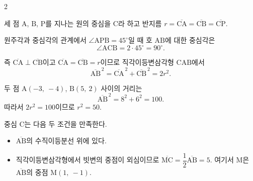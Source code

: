 \documentclass[10pt,fleqn]{article}
\begin{document}
\begin{multicols}{2}

\begin{center}
\end{center}

세 점 $\mathrm{A}$, $\mathrm{B}$, $\mathrm{P}$를 지나는 원의 중심을 $\mathrm{C}$라 하고 반지름 $r = \overline{\mathrm{CA}} = \overline{\mathrm{CB}} = \overline{\mathrm{CP}}$.

원주각과 중심각의 관계에서 $\angle \mathrm{APB} = 45^{\circ}$일 때 호 $\mathrm{AB}$에 대한 중심각은
\[ \angle \mathrm{ACB} = 2 \cdot 45^{\circ} = 90^{\circ}. \]

즉 $\overline{\mathrm{CA}} \perp \overline{\mathrm{CB}}$이고 $\overline{\mathrm{CA}} = \overline{\mathrm{CB}} = r$이므로 직각이등변삼각형 $\mathrm{CAB}$에서
\[ \overline{\mathrm{AB}}^{\,2} = \overline{\mathrm{CA}}^{\,2} + \overline{\mathrm{CB}}^{\,2} = 2 r^{2}. \]

두 점 $\mathrm{A}(-3,\ -4)$, $\mathrm{B}(5,\ 2)$ 사이의 거리는
\[ \overline{\mathrm{AB}}^{\,2} = 8^{2} + 6^{2} = 100. \]
따라서 $2 r^{2} = 100$이므로 $r^{2} = 50$.

중심 $\mathrm{C}$는 다음 두 조건을 만족한다.
\begin{itemize}[leftmargin=1.2em, itemsep=1pt]
\item $\overline{\mathrm{AB}}$의 수직이등분선 위에 있다.
\item 직각이등변삼각형에서 빗변의 중점이 외심이므로 $\overline{\mathrm{MC}} = \dfrac{1}{2}\overline{\mathrm{AB}} = 5$. 여기서 $\mathrm{M}$은 $\overline{\mathrm{AB}}$의 중점 $\mathrm{M}(1,\ -1)$.
\end{itemize}


\end{multicols}
\end{document}
